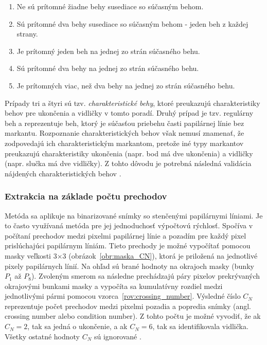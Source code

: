   \begin{enumerate}
    \item Ne sú prítomné žiadne behy susediace so súčasným behom.
    \item Sú prítomné dva behy susediace so súčasným behom - jeden beh z každej strany.
    \item Je prítomný jeden beh na jednej zo strán súčasného behu.
    \item Sú prítomné dva behy na jednej zo strán súčasného behu.
    \item Je prítomných viac, než dva behy na jednej zo strán súčasného behu.
  \end{enumerate}
  Prípady tri a štyri sú tzv. \emph{charakteristické behy}, ktoré preukazujú charakteristiky behov pre ukončenia a vidličky v tomto poradí. Druhý prípad je
  tzv. regulárny beh a reprezentuje beh, ktorý je súčasťou priebehu časti papilárnej línie bez markantu. Rozpoznanie charakteristických behov však
  nemusí znamenať, že zodpovedajú ich charakteristickým markantom, pretože iné typy markantov preukazujú charakteristiky ukončenia (napr. bod má dve ukončenia)
  a vidličky (napr. slučka má dve vidličky). Z tohto dôvodu je potrebná následná validácia nájdených charakteristických behov \cite{bansal2011minutiae}.

  \subsubsection*{Extrakcia na základe počtu prechodov} \label{sec:extrakcia_prechodmi}
  Metóda sa aplikuje na binarizované snímky so stenčenými papilárnymi líniami. Je to často využívaná metóda pre jej jednoduchosť výpočtovú rýchlosť.
  Spočíva v počítaní prechodov medzi pixelmi papilárnej línie a pozadím pre každý pixel prislúchajúci papilárnym líniám. Tieto prechody je možné vypočítať
  pomocou masky veľkosti {$3$$\times{}$$3$} (obrázok~{\ref{obr:maska_CN}}), ktorá je priložená na jednotlivé pixely papilárnych línií. Na ohľad sú brané
  hodnoty na okrajoch masky (bunky $P_1$ až $P_8$). Zvoleným smerom sa následne prechádzajú páry pixelov prekrývaných okrajovými bunkami masky a vypočíta
  sa kumulatívny rozdiel medzi jednotlivými pármi pomocou vzorca~{\ref{rov:crossing_number}}. Výsledné číslo $C_N$ reprezentuje počet prechodov medzi
  pixelmi pozadia a popredia snímky (angl. crossing number alebo condition number). Z tohto počtu je možné vyvodiť, že ak $C_N = 2$, tak sa jedná o ukončenie,
  a ak $C_N = 6$, tak sa identifikovala vidlička. Všetky ostatné hodnoty $C_N$ sú ignorované \cite{amengual1997minutiae_extraction}.

